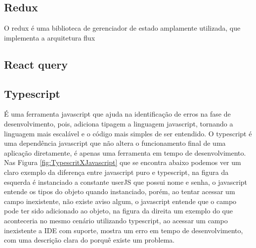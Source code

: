 \documentclass{ufersa}
\begin{document}
\subsection{Redux}
    O redux é uma biblioteca de gerenciador de estado amplamente utilizada, que implementa a arquitetura flux 

\subsection{React query}

\subsection{Typescript}
É uma ferramenta javascript que ajuda na identificação de erros na fase de desenvolvimento, pois,  adiciona tipagem a linguagem javascript, tornando a linguagem mais escalável e o código mais simples de ser entendido. O typescript é uma dependência javascript que não altera o funcionamento final de uma aplicação diretamente, é apenas uma ferramenta em tempo de desenvolvimento. Nas Figura \ref{fig:TypescritXJavascript}  que se encontra abaixo podemos ver um claro exemplo da diferença entre javascript puro e typescript, na figura da esquerda é instanciado a constante userJS que possui nome e senha, o javascript entende os tipos do objeto quando instanciado, porém, ao tentar acessar um campo inexistente, não existe aviso algum, o javascript entende que o campo pode ter sido adicionado ao objeto, na figura da direita um exemplo do que aconteceria no mesmo cenário utilizando typescript, ao acessar um campo inexistente a IDE com suporte, mostra um erro em tempo de desenvolvimento, com uma descrição clara do porquê existe um problema. 
\end{document}

